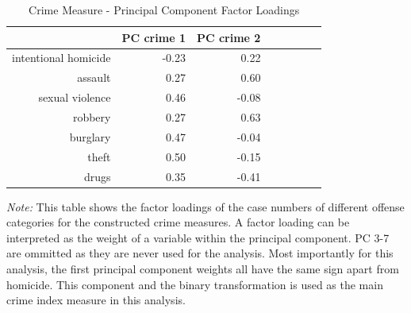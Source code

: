 \documentclass[a4paper,12pt]{article}
\begin{document}
\begin{singlespace}
		\begin{table}[!htbp]
			\centering
			\def\sym#1{\ifmmode^{#1}\else\(^{#1}\)\fi}
			\begin{threeparttable}
				\caption{Crime Measure - Principal Component Factor Loadings}\label{pca_factor_loadings} 
\begin{tabular}{rrrrrrrr}
  \hline
 & PC crime 1 & PC crime 2 \\ 
  \hline
intentional homicide & -0.23 & 0.22 \\ 
  assault & 0.27 & 0.60 \\ 
  sexual violence & 0.46 & -0.08  \\ 
  robbery & 0.27 & 0.63 \\ 
  burglary & 0.47 & -0.04\\ 
  theft & 0.50 & -0.15  \\ 
  drugs & 0.35 & -0.41 \\ 
   \hline
\end{tabular}
\begin{footnotesize}
				\begin{tablenotes}
					\item \textit{Note:} This table shows the factor loadings of the case numbers of different offense categories for the constructed crime measures. A factor loading can be interpreted as the weight of a variable within the principal component. PC 3-7 are ommitted as they are never used for the analysis. Most importantly for this analysis, the first principal component weights all have the same sign apart from homicide. This component and the binary transformation is used as the main crime index measure in this analysis.\\ 
				\end{tablenotes}
			\end{footnotesize}
			\end{threeparttable}
\end{table} 
\end{singlespace}
\end{document}
